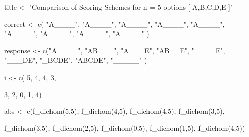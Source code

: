 \documentclass[
  letterpaper,
  DIV=11,
  numbers=noendperiod]{scrreprt}
\newenvironment{Shaded}{\begin{snugshade}}{\end{snugshade}}
\newcommand{\DecValTok}[1]{\textcolor[rgb]{0.68,0.00,0.00}{#1}}
\newcommand{\FunctionTok}[1]{\textcolor[rgb]{0.28,0.35,0.67}{#1}}
\newcommand{\NormalTok}[1]{\textcolor[rgb]{0.00,0.23,0.31}{#1}}
\newcommand{\OtherTok}[1]{\textcolor[rgb]{0.00,0.23,0.31}{#1}}
\newcommand{\StringTok}[1]{\textcolor[rgb]{0.13,0.47,0.30}{#1}}
\begin{document}
\begin{Shaded}
\begin{Highlighting}[]
\NormalTok{title }\OtherTok{\textless{}{-}} \StringTok{"Comparison of Scoring Schemes for n = 5 options [ A,B,C,D,E ]"}

\NormalTok{correct }\OtherTok{\textless{}{-}} \FunctionTok{c}\NormalTok{( }\StringTok{"A\_\_\_\_"}\NormalTok{,  }
              \StringTok{"A\_\_\_\_"}\NormalTok{,      }
              \StringTok{"A\_\_\_\_"}\NormalTok{,        }
              \StringTok{"A\_\_\_\_"}\NormalTok{,        }
              \StringTok{"A\_\_\_\_"}\NormalTok{,      }
              \StringTok{"A\_\_\_\_"}\NormalTok{,      }
              \StringTok{"A\_\_\_\_"}\NormalTok{,      }
              \StringTok{"A\_\_\_\_"}\NormalTok{,      }
              \StringTok{"A\_\_\_\_"}\NormalTok{ ) }

\NormalTok{response }\OtherTok{\textless{}{-}} \FunctionTok{c}\NormalTok{(}\StringTok{"A\_\_\_\_"}\NormalTok{,  }
              \StringTok{"AB\_\_\_"}\NormalTok{,      }
              \StringTok{"A\_\_\_E"}\NormalTok{,      }
              \StringTok{"AB\_\_E"}\NormalTok{,        }
              \StringTok{"\_\_\_\_E"}\NormalTok{,}
              \StringTok{"\_\_\_DE"}\NormalTok{,}
              \StringTok{"\_BCDE"}\NormalTok{,      }
              \StringTok{"ABCDE"}\NormalTok{,      }
              \StringTok{"\_\_\_\_\_"}\NormalTok{ )}

\NormalTok{i }\OtherTok{\textless{}{-}} \FunctionTok{c}\NormalTok{(        }\DecValTok{5}\NormalTok{,       }
               \DecValTok{4}\NormalTok{,              }
               \DecValTok{4}\NormalTok{,              }
               \DecValTok{3}\NormalTok{,               }
               
               \DecValTok{3}\NormalTok{,}
               \DecValTok{2}\NormalTok{,}
               \DecValTok{0}\NormalTok{,}
               \DecValTok{1}\NormalTok{,}
               \DecValTok{4}\NormalTok{)}

\NormalTok{abs }\OtherTok{\textless{}{-}} \FunctionTok{c}\NormalTok{(}\FunctionTok{f\_dichom}\NormalTok{(}\DecValTok{5}\NormalTok{,}\DecValTok{5}\NormalTok{), }
         \FunctionTok{f\_dichom}\NormalTok{(}\DecValTok{4}\NormalTok{,}\DecValTok{5}\NormalTok{), }
         \FunctionTok{f\_dichom}\NormalTok{(}\DecValTok{4}\NormalTok{,}\DecValTok{5}\NormalTok{), }
         \FunctionTok{f\_dichom}\NormalTok{(}\DecValTok{3}\NormalTok{,}\DecValTok{5}\NormalTok{), }
         
         \FunctionTok{f\_dichom}\NormalTok{(}\DecValTok{3}\NormalTok{,}\DecValTok{5}\NormalTok{), }
         \FunctionTok{f\_dichom}\NormalTok{(}\DecValTok{2}\NormalTok{,}\DecValTok{5}\NormalTok{),}
         \FunctionTok{f\_dichom}\NormalTok{(}\DecValTok{0}\NormalTok{,}\DecValTok{5}\NormalTok{),}
         \FunctionTok{f\_dichom}\NormalTok{(}\DecValTok{1}\NormalTok{,}\DecValTok{5}\NormalTok{),}
         \FunctionTok{f\_dichom}\NormalTok{(}\DecValTok{4}\NormalTok{,}\DecValTok{5}\NormalTok{))}


\end{Highlighting}
\end{Shaded}
\end{document}
